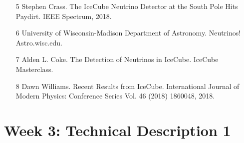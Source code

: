 \documentclass{article}
\begin{document}
\begin{enumerate}
\begin{itemize}
\item [5] Stephen Crass. The IceCube Neutrino Detector at the South Pole Hits Paydirt. IEEE Spectrum, 2018. 
\item [6] University of Wisconsin-Madison Department of Astronomy. Neutrinos! Astro.wisc.edu. 
\item [7] Alden L. Coke. The Detection of Neutrinos in IceCube. IceCube Masterclass. 
\item [8] Dawn Williams. Recent Results from IceCube. International Journal of Modern Physics: Conference Series Vol. 46 (2018) 1860048, 2018.
\end{itemize}
\end{enumerate}

\section{Week 3: Technical Description 1}
\end{document}
